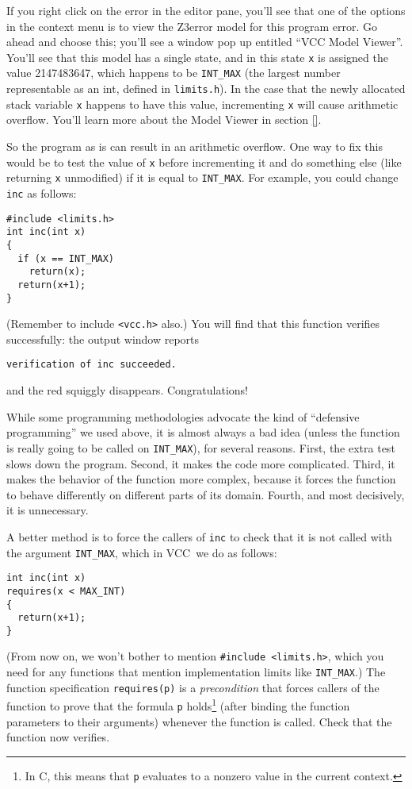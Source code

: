 \documentclass{report}
\newcommand{\Q}[1]{\lstinline~#1~}
\newcommand{\VCC}{VCC}
\newcommand{\Z}{Z3}
\newcommand{\Def}[1]{\emph{#1}}
\newcommand{\Ref}[1]{section \ref{#1}}
\begin{document}
If you right click on the error in the editor pane, you'll see that
one of the options in the context menu is to view the \Z error model
for this program error. Go ahead and choose this; you'll see a window
pop up entitled ``VCC Model Viewer''. You'll see that this model has a
single state, and in this state \Q{x} is assigned the value
2147483647, which happens to be \Q{INT_MAX} (the largest number
representable as an int, defined in \Q{limits.h}). In the case that
the newly allocated stack variable \Q{x} happens to have this value,
incrementing \Q{x} will cause arithmetic overflow. You'll learn more
about the Model Viewer in \Ref{}.

So the program as is can result in an arithmetic overflow. One way to
fix this would be to test the value of \Q{x} before incrementing it
and do something else (like returning \Q{x} unmodified) if it is equal
to \Q{INT_MAX}. For example, you could change \Q{inc} as follows:
\begin{lstlisting}
#include <limits.h>
int inc(int x)
{
  if (x == INT_MAX)
    return(x);
  return(x+1);
}
\end{lstlisting}
(Remember to include \Q{<vcc.h>} also.) You will find that this
function verifies successfully: the output window reports
\begin{lstlisting}
verification of inc succeeded.
\end{lstlisting}
and the red squiggly disappears. Congratulations!

While some programming methodologies advocate the kind of ``defensive
programming'' we used above, it is almost always a bad idea (unless
the function is really going to be called on \Q{INT_MAX}), for several
reasons.  First, the extra test slows down the program.  Second, it
makes the code more complicated.  Third, it makes the behavior of the
function more complex, because it forces the function to behave
differently on different parts of its domain.  Fourth, and most
decisively, it is unnecessary.

A better method is to force the callers of \Q{inc}
to check that it is not called with the argument \Q{INT_MAX}, which in
\VCC\ we do as follows:
\begin{lstlisting}
int inc(int x)
requires(x < MAX_INT)
{
  return(x+1);
}
\end{lstlisting}
(From now on, we won't bother to mention \Q{#include <limits.h>},
which you need for any functions that mention implementation limits
like \Q{INT_MAX}.)  The function specification \Q{requires(p)} is a
\Def{precondition} that forces callers of the function to prove that
the formula \Q{p} holds\footnote{In C, this means that \Q{p} evaluates
  to a nonzero value in the current context.}  (after binding the
function parameters to their arguments) whenever the function is
called.  Check that the function now verifies.
\end{document}
